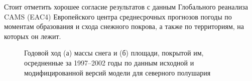 \documentclass[a4paper, fontsize=14pt]{scrartcl}
\begin{document}
Стоит отметить хорошее согласие результатов с данным Глобального реанализа CAMS (EAC4) Европейского центра среднесрочных прогнозов погоды по моментам образования и схода снежного покрова, а также по территориям, на которых он лежит.


\begin{figure}[h]
    \begin{minipage}[h]{0.52\linewidth}
    \end{minipage}
    \begin{minipage}[h]{0.52\linewidth}
    \end{minipage}\sloppy
    \caption{Годовой ход (а) массы снега и (б) площади, покрытой им, осредненные за 1997--2002 годы по данным исходной и модифицированной версий модели для северного полушария}
    \label{fig:imageSn}
\end{figure}
\end{document}
